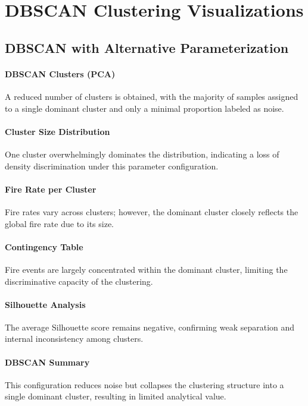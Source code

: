 \section{DBSCAN Clustering Visualizations}\label{annexe:dbscan_visualizations}

\subsection{DBSCAN with Alternative Parameterization}

\paragraph{DBSCAN Clusters (PCA)}
A reduced number of clusters is obtained, with the majority of samples assigned to a single dominant cluster and only a minimal proportion labeled as noise.

\paragraph{Cluster Size Distribution}
One cluster overwhelmingly dominates the distribution, indicating a loss of density discrimination under this parameter configuration.

\paragraph{Fire Rate per Cluster}
Fire rates vary across clusters; however, the dominant cluster closely reflects the global fire rate due to its size.

\paragraph{Contingency Table}
Fire events are largely concentrated within the dominant cluster, limiting the discriminative capacity of the clustering.

\paragraph{Silhouette Analysis}
The average Silhouette score remains negative, confirming weak separation and internal inconsistency among clusters.

\paragraph{DBSCAN Summary}
This configuration reduces noise but collapses the clustering structure into a single dominant cluster, resulting in limited analytical value.

